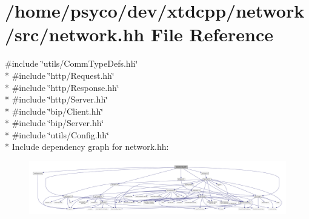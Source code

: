 \hypertarget{network_8hh}{}\section{/home/psyco/dev/xtdcpp/network/src/network.hh File Reference}
\label{network_8hh}
{\ttfamily \#include \char`\"{}utils/\+Comm\+Type\+Defs.\+hh\char`\"{}}\\*
{\ttfamily \#include \char`\"{}http/\+Request.\+hh\char`\"{}}\\*
{\ttfamily \#include \char`\"{}http/\+Response.\+hh\char`\"{}}\\*
{\ttfamily \#include \char`\"{}http/\+Server.\+hh\char`\"{}}\\*
{\ttfamily \#include \char`\"{}bip/\+Client.\+hh\char`\"{}}\\*
{\ttfamily \#include \char`\"{}bip/\+Server.\+hh\char`\"{}}\\*
{\ttfamily \#include \char`\"{}utils/\+Config.\+hh\char`\"{}}\\*
Include dependency graph for network.\+hh\+:
\nopagebreak
\begin{figure}[H]
\begin{center}
\leavevmode
\includegraphics[width=350pt]{network_8hh__incl}
\end{center}
\end{figure}
